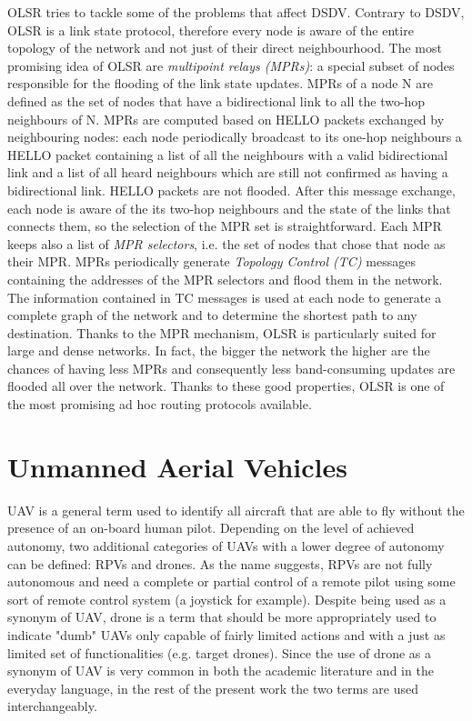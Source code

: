 \gls{OLSR} tries to tackle some of the problems that affect \gls{DSDV}. Contrary to \gls{DSDV}, \gls{OLSR} is a link state protocol, therefore every node is aware of the entire topology of the network and not just of their direct neighbourhood. The most promising idea of \gls{OLSR} are \textit{multipoint relays (MPRs)}: a special subset of nodes responsible for the flooding of the link state updates. MPRs of a node N are defined as the set of nodes that have a bidirectional link to all the two-hop neighbours of N. MPRs are computed based on HELLO packets exchanged by neighbouring nodes: each node periodically broadcast to its one-hop neighbours a HELLO packet containing a list of all the neighbours with a valid bidirectional link and a list of all heard neighbours which are still not confirmed as having a bidirectional link. HELLO packets are not flooded. After this message exchange, each node is aware of the its two-hop neighbours and the state of the links that connects them, so the selection of the MPR set is straightforward. Each MPR keeps also a list of \textit{MPR selectors}, i.e. the set of nodes that chose that node as their MPR. MPRs periodically generate \textit{Topology Control (TC)} messages containing the addresses of the MPR selectors and flood them in the network. The information contained in TC messages is used at each node to generate a complete graph of the network and to determine the shortest path to any destination. Thanks to the MPR mechanism, \gls{OLSR} is particularly suited for large and dense networks. In fact, the bigger the network the higher are the chances of having less MPRs and consequently less band-consuming updates are flooded all over the network. Thanks to these good properties, \gls{OLSR} is one of the most promising ad hoc routing protocols available.   



\section{Unmanned Aerial Vehicles}

\gls{UAV} is a general term used to identify all aircraft that are able to fly without the presence of an on-board human pilot. Depending on the level of achieved autonomy, two additional categories of \glspl{UAV} with a lower degree of autonomy can be defined: \glspl{RPV} and drones. As the name suggests, \glspl{RPV} are not fully autonomous and need a complete or partial control of a remote pilot using some sort of remote control system (a joystick for example). Despite being used as a synonym of \gls{UAV}, drone is a term that should be more appropriately used to indicate "dumb" \glspl{UAV} only capable of fairly limited actions and with a just as limited set of functionalities (e.g. target drones). Since the use of drone as a synonym of \gls{UAV} is very common in both the academic literature and in the everyday language, in the rest of the present work the two terms are used interchangeably. 

